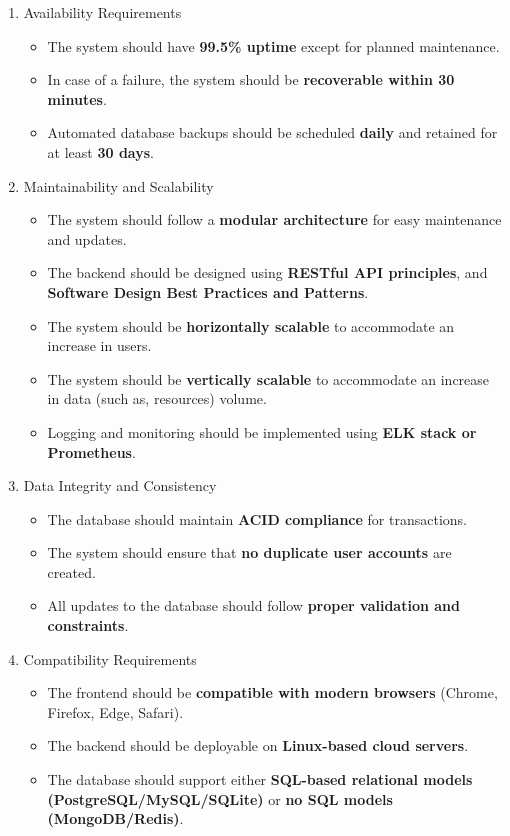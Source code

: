 \begin{enumerate}
    \item Availability Requirements
    \begin{itemize}
        \item The system should have \textbf{99.5\% uptime} except for planned maintenance.
        \item In case of a failure, the system should be \textbf{recoverable within 30 minutes}.
        \item Automated database backups should be scheduled \textbf{daily} and retained for at least \textbf{30 days}.
    \end{itemize}

    \item Maintainability and Scalability
    \begin{itemize}
        \item The system should follow a \textbf{modular architecture} for easy maintenance and updates.
        \item The backend should be designed using \textbf{RESTful API principles}, and \textbf{Software Design Best Practices and Patterns}.
        \item The system should be \textbf{horizontally scalable} to accommodate an increase in users.
        \item The system should be \textbf{vertically scalable} to accommodate an increase in data (such as, resources) volume.
        \item Logging and monitoring should be implemented using \textbf{ELK stack or Prometheus}.
    \end{itemize}

    \item Data Integrity and Consistency
    \begin{itemize}
        \item The database should maintain \textbf{ACID compliance} for transactions.
        \item The system should ensure that \textbf{no duplicate user accounts} are created.
        \item All updates to the database should follow \textbf{proper validation and constraints}.
    \end{itemize}

    \item Compatibility Requirements
    \begin{itemize}
        \item The frontend should be \textbf{compatible with modern browsers} (Chrome, Firefox, Edge, Safari).
        \item The backend should be deployable on \textbf{Linux-based cloud servers}.
        \item The database should support either \textbf{SQL-based relational models (PostgreSQL/MySQL/SQLite)} or \textbf{no SQL models (MongoDB/Redis)}.
    \end{itemize}


\end{enumerate}
